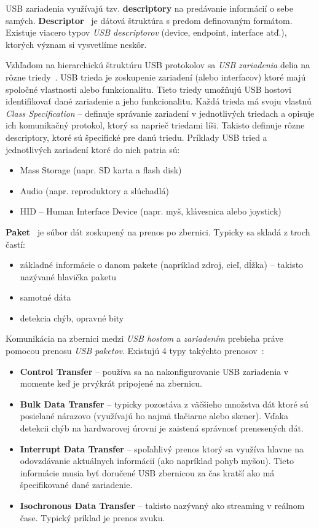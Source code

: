 USB zariadenia využívajú tzv. \textbf{descriptory} na predávanie informácií o sebe samých. \textbf{Descriptor}~\cite{usb_descriptor} je dátová štruktúra s predom definovaným formátom. Existuje viacero typov \textit{USB descriptorov} (device, endpoint, interface atď.), ktorých význam si vysvetlíme neskôr.

Vzhľadom na hierarchickú štruktúru USB protokolov sa \textit{USB zariadenia} delia na rôzne triedy~\cite{usb_classes}. USB trieda je zoskupenie zariadení (alebo interfacov) ktoré majú spoločné vlastnosti alebo funkcionalitu. Tieto triedy umožňujú USB hostovi identifikovať dané zariadenie a jeho funkcionalitu. Každá trieda má svoju vlastnú \textit{Class Specification} -- definuje správanie zariadení v jednotlivých triedach a opisuje ich komunikačný protokol, ktorý sa naprieč triedami líši. Takisto definuje rôzne descriptory, ktoré sú špecifické pre danú triedu. Príklady USB tried a jednotlivých zariadení ktoré do nich patria sú:
\begin{itemize}
\item Mass Storage (napr. SD karta a flash disk)
\item Audio (napr. reproduktory a slúchadlá)
\item HID -- Human Interface Device (napr. myš, klávesnica alebo joystick)
\end{itemize}

\textbf{Paket}~\cite{usb_packet} je súbor dát zoskupený na prenos po zbernici. Typicky sa skladá z troch častí:
\begin{itemize}
\item základné informácie o danom pakete (napríklad zdroj, cieľ, dĺžka) -- takisto nazývané hlavička paketu
\item samotné dáta
\item detekcia chýb, opravné bity
\end{itemize}

Komunikácia na zbernici medzi \textit{USB hostom} a \textit{zariadením} prebieha práve pomocou prenosu \textit{USB paketov}.   Existujú 4 typy takýchto prenosov~\cite{usb_type_transfers}:
\begin{itemize}
\item \textbf{Control Transfer} -- používa sa na nakonfigurovanie USB zariadenia v momente keď je prvýkrát pripojené na zbernicu.
\item \textbf{Bulk Data Transfer} -- typicky pozostáva z väčšieho množstva dát ktoré sú posielané nárazovo (využívajú ho najmä tlačiarne alebo skener). Vďaka detekcii chýb na hardwarovej úrovni je zaistená správnosť prenesených dát.
\item \textbf{Interrupt Data Transfer} -- spoľahlivý prenos ktorý sa využíva hlavne na odovzdávanie aktuálnych informácií (ako napríklad pohyb myšou). Tieto informácie musia byť doručené USB zbernicou za čas kratší ako má špecifikované dané zariadenie.
\item \textbf{Isochronous Data Transfer} -- takisto nazývaný ako streaming v reálnom čase. Typický príklad je prenos zvuku.
\end{itemize}

